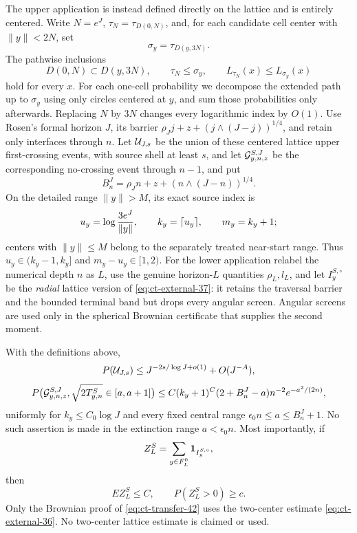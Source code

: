 The upper application is instead defined directly on the lattice and is
entirely centered.  Write $N=e^J$, $\tau_N=\tau_{D(0,N)}$, and, for
each candidate cell center with $\|y\|<2N$, set
\begin{equation}
\sigma_y=\tau_{D(y,3N)}.\label{eq:ct-transfer-39k}
\end{equation}
The pathwise inclusions
\begin{equation}
D(0,N)\subset D(y,3N),\qquad \tau_N\le\sigma_y,
 \qquad L_{\tau_N}(x)\le L_{\sigma_y}(x)\label{eq:ct-transfer-39l}
\end{equation}
hold for every $x$.  For each one-cell probability we decompose the
extended path up to $\sigma_y$ using only circles centered at $y$,
and sum those probabilities only afterwards.  Replacing $N$ by $3N$
changes every logarithmic index by $O(1)$.  Use Rosen's formal horizon
$J$, its barrier $\rho_Jj+z+(j\wedge(J-j))^{1/4}$, and retain only
interfaces through $n$.  Let ${\cal U}_{J,s}$ be the union of these
centered lattice upper first-crossing events, with source shell at least
$s$, and let
${\cal G}^{S,J}_{y,n,z}$ be the corresponding no-crossing event through
$n-1$, and put
\[
B_n^J=\rho_Jn+z+(n\wedge(J-n))^{1/4}.
\]
On the detailed range $\|y\|>M$, its exact source index is
\begin{equation}
u_y=\log {3e^J\over\|y\|},\qquad
 k_y=\lceil u_y\rceil,\qquad m_y=k_y+1;\label{eq:ct-transfer-39m}
\end{equation}
centers with $\|y\|\le M$ belong to the separately treated near-start
range.  Thus $u_y\in(k_y-1,k_y]$ and $m_y-u_y\in[1,2)$.
For the lower application relabel the numerical depth $n$ as $L$,
use the genuine horizon-$L$ quantities $\rho_L,l_L$, and let
$I_y^{S,\circ}$ be the \emph{radial} lattice version of \eqref{eq:ct-external-37}: it retains
the traversal barrier and the bounded terminal band but drops every
angular screen.  Angular screens are used only in the spherical
Brownian certificate that supplies the second moment.

\begin{lemma}\label{lem:buffered-transfer}
With the definitions above,
\begin{equation}
P({\cal U}_{J,s})\le J^{-2s/\log J+o(1)}+O(J^{-A}),\label{eq:ct-transfer-40}
\end{equation}
\begin{equation}
P\big({\cal G}^{S,J}_{y,n,z},
       \sqrt{2T^S_{y,n}}\in[a,a+1]\big)
 \le C(k_y+1)^C(2+B_n^J-a)n^{-2}e^{-a^2/(2n)},\label{eq:ct-transfer-41}
\end{equation}
uniformly for $k_y\le C_0\log J$ and every fixed central range
$\epsilon_0n\le a\le B_n^J+1$.  No such assertion is made in the
extinction range $a<\epsilon_0n$.  Most importantly, if
\[
Z_L^S=\sum_{y\in F_L^0}{\bf1}_{I_y^{S,\circ}},
\]
then
\begin{equation}
EZ_L^S\le C,\qquad P(Z_L^S>0)\ge c.\label{eq:ct-transfer-42}
\end{equation}
Only the Brownian proof of \eqref{eq:ct-transfer-42} uses the two-center estimate \eqref{eq:ct-external-36}.
No two-center lattice estimate is claimed or used.

\end{lemma}

